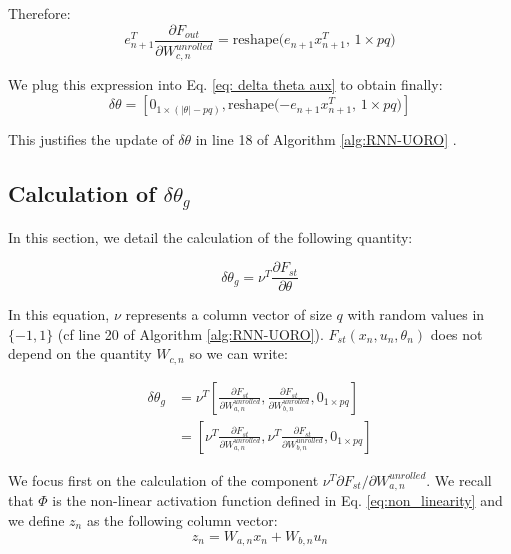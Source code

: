 \documentclass[twocolumn,a4paper]{svjour3} \sloppy          \smartqed
\begin{document}
Therefore:
\begin{equation}
e_{n+1}^T \frac{\partial F_{out}}{\partial W_{c,n}^{unrolled}} = \text{reshape($e_{n+1} x_{n+1}^T$, $1 \times pq$)} 
\end{equation}

We plug this expression into Eq. \ref{eq: delta theta aux} to obtain finally: 
\begin{equation}\label{eq:delta theta calculation result}
\delta \theta = [ 0_{1 \times (|\theta|-pq)}, \text{reshape($- e_{n+1} x_{n+1}^T$, $1 \times pq$)}] 
\end{equation} 

This justifies the update of $\delta \theta$ in line 18 of Algorithm \ref{alg:RNN-UORO} \footnotemark.



\subsection{Calculation of $\delta \theta_g$}

In this section, we detail the calculation of the following quantity:

\begin{equation}
\delta \theta_g = \nu ^T \frac{\partial F_{st}}{\partial \theta}
\end{equation}

In this equation, $\nu$ represents a column vector of size $q$ with random values in $\{ -1, 1\}$ (cf line 20 of Algorithm \ref{alg:RNN-UORO}). $F_{st}(x_n, u_n, \theta_n)$ does not depend on the quantity $W_{c,n}$ so we can write:

\begin{align}
\delta \theta_g &= \nu^T \left[ \frac{\partial F_{st}}{\partial W_{a,n}^{unrolled}}, \frac{\partial F_{st}}{\partial W_{b,n}^{unrolled}}, 0_{1 \times pq} \right] \\
&= \left[ \nu^T \frac{\partial F_{st}}{\partial W_{a,n}^{unrolled}}, \nu^T \frac{\partial F_{st}}{\partial W_{b,n}^{unrolled}}, 0_{1 \times pq} \right] \label{eq:delta theta_g aux 3}
\end{align} 

We focus first on the calculation of the component $\nu^T \partial F_{st}/\allowbreak\partial W_{a,n}^{unrolled}$. We recall that $\Phi$ is the non-linear activation function defined in Eq. \ref{eq:non_linearity} and we define $z_n$ as the following column vector:
\begin{equation} \label{eq:z_n definition}
z_n = W_{a,n} x_n + W_{b,n} u_n
\end{equation} 
\end{document}

